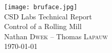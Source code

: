 \begin{titlepage}
\centering

\vspace*{\fill}

\texttt{[image: bruface.jpg]}~\\ [0.75cm]
{\Large CSD Labs Technical Report}\\ [0.3cm]
{\Large Control of a Rolling Mill}\\[0.7cm]

{\large Nathan \textsc{Dwek} -- Thomas \textsc{Lapauw}}\\[0.2cm]

{\small \today}

\vspace{5cm}
\vspace*{\fill}

\end{titlepage}
